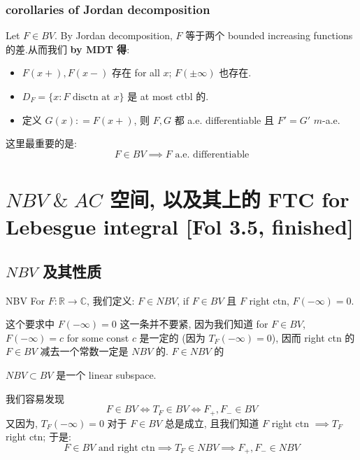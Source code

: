 \documentclass[lang=cn,11pt]{elegantbook}
\begin{document}
\subsection{corollaries of Jordan decomposition}
\begin{corollary}
Let $F \in BV$. By Jordan decomposition,  $F$ 等于两个 bounded increasing functions 的差.从而我们\textbf{ by MDT 得}: 
    \begin{itemize}
        \item $F(x+), F(x-)$ 存在 for all $x$; $F(\pm\infty)$ 也存在.
        \item $D_F = \{x: F \text{ disctn at }x \}$ 是 at most ctbl 的.
        \item 定义 $G (x) : = F(x+)$, 则 $F,G$ 都 a.e. differentiable 且 $F' = G'$ $m$-a.e.
    \end{itemize}
\end{corollary}
这里最重要的是: \[
F \in BV \implies F \text{ a.e. differentiable}
\]





\chapter{ $ NBV \;\&\; AC $ 空间, 以及其上的 FTC for Lebesgue integral [Fol 3.5, finished] }
\section{$NBV$ 及其性质}
\begin{definition}{NBV}
    For $F:\mathbb{R}\to \mathbb{C}$, 我们定义: $F \in NBV$, if $F \in BV$ 且 $F$ right ctn, $F(-\infty) = 0$.
\end{definition}
\begin{remark}
这个要求中 $F(-\infty) = 0$ 这一条并不要紧, 因为我们知道 for $F\in BV$, $F(-\infty) = c$ for some const $c$ 是一定的 (因为 $T_F(-\infty) =0$), 因而 right ctn 的 $F\in BV$ 减去一个常数一定是 $NBV$ 的.
    $F \in NBV$ 的
\end{remark}

\begin{proposition}
    $NBV \subset BV$ 是一个 linear subspace.
\end{proposition}
\begin{remark}
我们容易发现\[
    F \in BV \iff T_F \in BV \iff F_+, F_-  \in BV
    \]
又因为, $T_F (-\infty) = 0$ 对于 $F\in BV$ 总是成立, 且我们知道 $F$ right ctn $\implies T_F $ right ctn; 于是: \[
    F \in BV \text{ and right ctn} \implies T_F \in NBV \implies  F_+, F_- \in NBV
    \]
\end{remark}
\end{document}

